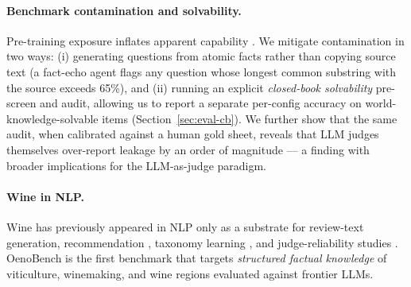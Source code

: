 \paragraph{Benchmark contamination and solvability.} Pre-training
exposure inflates apparent capability \citep{sainz2023contamination,
magar2022contamination, dodge2021documenting}. We mitigate contamination
in two ways: (i) generating questions from atomic facts rather than
copying source text (a fact-echo agent flags any question whose longest
common substring with the source exceeds 65\%), and (ii) running an
explicit \emph{closed-book solvability} pre-screen and audit, allowing
us to report a separate per-config accuracy on world-knowledge-solvable
items (Section~\ref{sec:eval-cb}). We further show that the same audit,
when calibrated against a human gold sheet, reveals that LLM judges
themselves over-report leakage by an order of magnitude --- a finding
with broader implications for the LLM-as-judge paradigm.

\paragraph{Wine in NLP.} Wine has previously appeared in NLP only as a
substrate for review-text generation, recommendation
\citep{chen2014winerec}, taxonomy learning \citep{lefever2017winenlp},
and judge-reliability studies \citep{hodgson2017winereviews}.
OenoBench is the first benchmark that targets \emph{structured factual
knowledge} of viticulture, winemaking, and wine regions evaluated
against frontier LLMs.
